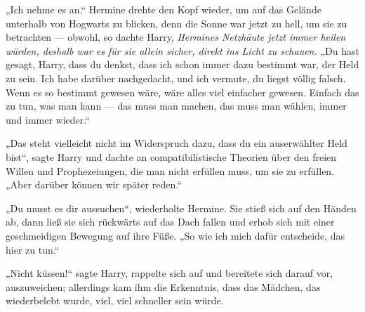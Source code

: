 „Ich nehme es an.“
Hermine drehte den Kopf wieder, um auf das Gelände unterhalb von Hogwarts zu blicken, denn die Sonne war jetzt zu hell, um sie zu betrachten — obwohl, so dachte Harry, \emph{Hermines Netzhäute jetzt immer heilen würden, deshalb war es für sie allein sicher, direkt ins Licht zu schauen.}
„Du hast gesagt, Harry, dass du denkst, dass ich schon immer dazu bestimmt war, der Held zu sein. Ich habe darüber nachgedacht, und ich vermute, du liegst völlig falsch. Wenn es so bestimmt gewesen wäre, wäre alles viel einfacher gewesen. Einfach das zu tun, was man kann — das muss man machen, das muss man wählen, immer und immer wieder.“

„Das steht vielleicht nicht im Widerspruch dazu, dass du ein auserwählter Held bist“, sagte Harry und dachte an compatibilistische Theorien über den freien Willen und Prophezeiungen, die man nicht erfüllen muss, um sie zu erfüllen.
„Aber darüber können wir später reden.“

„Du musst es dir aussuchen“, wiederholte Hermine.
Sie stieß sich auf den Händen ab, dann ließ sie sich rückwärts auf das Dach fallen und erhob sich mit einer geschmeidigen Bewegung auf ihre Füße.
„So wie ich mich dafür entscheide, das hier zu tun.“

„Nicht küssen!“ sagte Harry, rappelte sich auf und bereitete sich darauf vor, auszuweichen; allerdings kam ihm die Erkenntnis, dass das Mädchen, das wiederbelebt wurde, viel, viel schneller sein würde.

